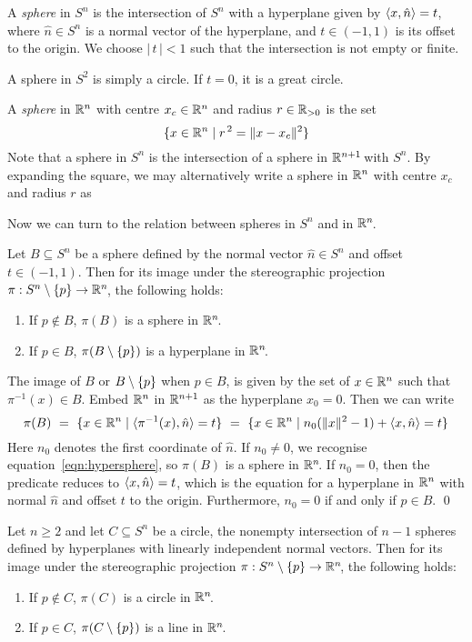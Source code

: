 A \emph{sphere} in $S^n$ is the intersection of $S^n$
with a hyperplane given by $\langle x, \hat{n} \rangle = t$,
where $\hat{n} \in S^n$ is a normal vector of the hyperplane,
and $t \in (-1, 1)$ is its offset to the origin.
We choose $|\,t\,| < 1$ such that the intersection is not empty or finite.

\example
A sphere in $S^2$ is simply a circle.
If $t = 0$, it is a great circle.

A \emph{sphere} in $\mathbb{R}^n$ with centre $x_c \in \mathbb{R}^n$ and radius $r \in \mathbb{R}_{>0}$
is the set
\[ \{  x \in \mathbb{R}^n \mid r^{\,2} = \|x - x_c\|^2  \} \]
Note that a sphere in $S^n$ is the intersection of a sphere in $\mathbb{R}^{n + 1}\!$ with $S^n\!$.
By expanding the square,
we may alternatively write a sphere in $\mathbb{R}^n$
with centre $x_c$ and radius $r$ as
\begin{equationref}
\label{eqn:hypersphere}
\end{equationref}
Now we can turn to the relation between spheres in $S^n$ and in $\mathbb{R}^n\!$.

\proposition
Let $B \subseteq S^n$ be a sphere defined by the normal vector $\hat{n} \in S^n$
and offset $t \in (-1, 1)$.
Then for its image under the stereographic projection $\pi : S^n \setminus \{ p \} \to \mathbb{R}^n\!$,
the following holds:
\begin{enumerate}
\item If $p \notin B$, $\pi(B)$ is a sphere in $\mathbb{R}^n\!$.
\item If $p \in B$, $\pi(B \setminus \{ p \})$ is a hyperplane in $\mathbb{R}^n\!$.
\end{enumerate}

\proof
The image of $B$ or $B \setminus \{ p \}$ when $p \in B$,
is given by the set of $x \in \mathbb{R}^n$ such that $\pi^{-1}(x) \in B$.
Embed $\mathbb{R}^n$ in $\mathbb{R}^{n + 1}$ as the hyperplane $x_0 = 0$.
Then we can write
\[ \pi(B)
\ = \ \{ x \in \mathbb{R}^n \mid \langle \pi^{-1}(x), \hat{n} \rangle = t  \}
\ = \ \{ x \in \mathbb{R}^n \mid n_0(\|x\|^2 - 1) + \langle x, \hat{n} \rangle = t  \} \]
Here $n_0$ denotes the first coordinate of $\hat{n}$.
If $n_0 \neq 0$,
we recognise equation~\ref{eqn:hypersphere},
so $\pi(B)$ is a sphere in $\mathbb{R}^n\!$.
If $n_0 = 0$,
then the predicate reduces to $\langle x, \hat{n} \rangle = t$,
which is the equation for a hyperplane in $\mathbb{R}^n$ with normal $\hat{n}$
and offset $t$ to the origin.
Furthermore, $n_0 = 0$ if and only if $p \in B$.
\qed

\proposition
Let $n \geq 2$ and let $C \subseteq S^n$ be a circle,
the nonempty intersection of $n - 1$ spheres
defined by hyperplanes with linearly independent normal vectors.
Then for its image under the stereographic projection $\pi : S^n \setminus \{ p \} \to \mathbb{R}^n\!$,
the following holds:
\begin{enumerate}
\item If $p \notin C$, $\pi(C)$ is a circle in $\mathbb{R}^n\!$.
\item If $p \in C$, $\pi(C \setminus \{ p \})$ is a line in $\mathbb{R}^n\!$.
\end{enumerate}

